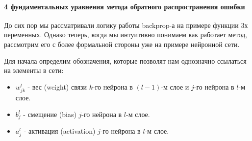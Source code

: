 \paragraph{4 фундаментальных уравнения метода обратного распространения ошибки}

До сих пор мы рассматривали логику работы backprop-а на примере функции 
3х переменных. Однако теперь, когда мы интуитивно понимаем как работает метод, 
рассмотрим его с более формальной стороны уже на примере нейронной сети. 

Для начала определим обозначения, которые позволят нам однозначно ссылаться на 
элементы в сети:
\begin{itemize}
    \item $w_{jk}^l$ - вес (weight) связи $k$-го нейрона в $(l-1)$-м слое и $j$-го нейрона в $l$-м слое.
    \item $b_j^l$ - смещение (bias) $j$-го нейрона в $l$-м слое.
    \item $a_j^l$ - активация (activation) $j$-го нейрона в $l$-м слое.
\end{itemize}

